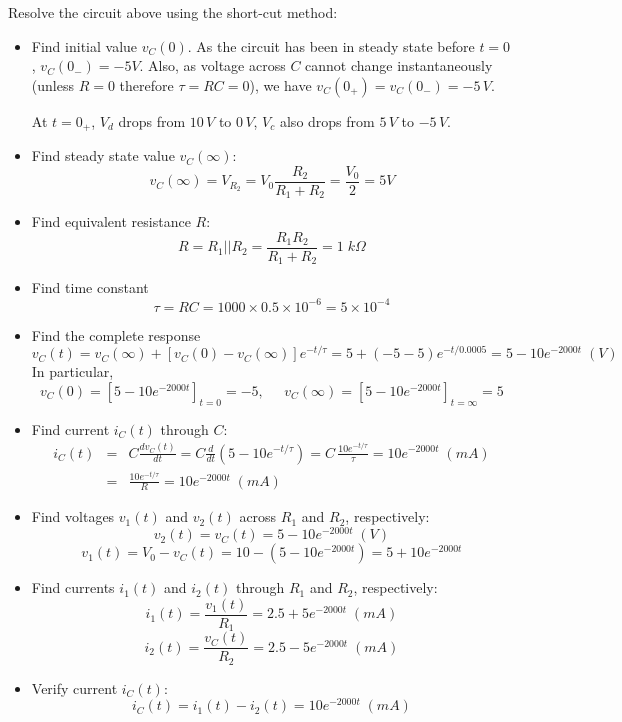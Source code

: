 Resolve the circuit above using the short-cut method:
\begin{itemize}
\item Find initial value $v_C(0)$. As the circuit has been in steady 
  state before $t=0$, $v_C(0_-)=-5V$. Also, as voltage across $C$ 
  cannot change instantaneously (unless $R=0$ therefore $\tau=RC=0$), 
  we have $v_C(0_+)=v_C(0_-)=-5\,V$.

  At $t=0_+$, $V_d$ drops from $10\,V$ to $0\,V$, $V_c$ also drops 
  from $5\,V$ to $-5\,V$.
  
\item Find steady state value $v_C(\infty)$:
  \[
  v_C(\infty)=V_{R_2}=V_0\frac{R_2}{R_1+R_2}=\frac{V_0}{2}=5V	
  \]
\item Find equivalent resistance $R$:
  \[
  R=R_1 || R_2=\frac{R_1 R_2}{R_1+R_2}=1\;k\Omega	
  \]
\item Find time constant 
  \[
  \tau=RC=1000\times 0.5\times 10^{-6}=5\times 10^{-4}     
  \]
\item Find the complete response
  \[
  v_C(t)=v_C(\infty)+[v_C(0)-v_C(\infty)]e^{-t/\tau}
  =5+(-5-5) e^{-t/0.0005}=5-10 e^{-2000t}\;(V)	
  \]
  In particular,
  \[
  v_C(0)=\left[5-10 e^{-2000t}\right]_{t=0}=-5,\;\;\;\;\;
  v_C(\infty)=\left[5-10 e^{-2000t}\right]_{t=\infty}=5
  \]

\item Find current $i_C(t)$ through $C$:
  \begin{eqnarray}
    i_C(t)&=&C\frac{dv_C(t)}{dt}=C\frac{d}{dt}(5-10 e^{-t/\tau})
    =C\,\frac{10 e^{-t/\tau}}{\tau}=10 e^{-2000 t}\;(mA)	
    \nonumber \\
    &=&\frac{10 e^{-t/\tau}}{R}=10 e^{-2000 t}\;(mA)	
    \nonumber
  \end{eqnarray}
\item Find voltages $v_1(t)$ and $v_2(t)$ across $R_1$ and $R_2$,
  respectively:
  \[ 
  v_2(t)=v_C(t)=5-10 e^{-2000t}\;(V)	
  \]
  \[ 
  v_1(t)=V_0-v_C(t)=10-(5-10 e^{-2000t})=5+10 e^{-2000t} 
  \]
\item Find currents $i_1(t)$ and $i_2(t)$ through $R_1$ and $R_2$, 
  respectively:
  \[
  i_1(t)=\frac{v_1(t)}{R_1}=2.5+5 e^{-2000t} \; (mA)	
  \]
  \[
  i_2(t)=\frac{v_C(t)}{R_2}=2.5-5 e^{-2000t}\; (mA)	
  \]
\item Verify current $i_C(t)$:
  \[
  i_C(t)=i_1(t)-i_2(t)=10 e^{-2000t} \; (mA)	
  \]
\end{itemize}


